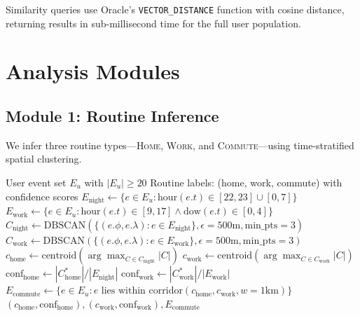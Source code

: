 \documentclass[11pt,a4paper]{article}
\begin{document}
Similarity queries use Oracle's \texttt{VECTOR\_DISTANCE} function with cosine distance, returning results in sub-millisecond time for the full user population.

\section{Analysis Modules}
\label{sec:analysis}

\subsection{Module 1: Routine Inference}
\label{sec:routine_inference}

We infer three routine types---\textsc{Home}, \textsc{Work}, and \textsc{Commute}---using time-stratified spatial clustering.

\begin{algorithm}[H]
\caption{Routine Inference via Time-Stratified DBSCAN}
\label{alg:routine}
\begin{algorithmic}[1]
\REQUIRE User event set $E_u$ with $|E_u| \geq 20$
\ENSURE Routine labels: (home, work, commute) with confidence scores
\STATE $E_{\text{night}} \leftarrow \{e \in E_u : \text{hour}(e.t) \in [22, 23] \cup [0, 7]\}$
\STATE $E_{\text{work}} \leftarrow \{e \in E_u : \text{hour}(e.t) \in [9, 17] \wedge \text{dow}(e.t) \in [0,4]\}$
\STATE $C_{\text{night}} \leftarrow \text{DBSCAN}(\{(e.\phi, e.\lambda) : e \in E_{\text{night}}\}, \epsilon=500\text{m}, \text{min\_pts}=3)$
\STATE $C_{\text{work}} \leftarrow \text{DBSCAN}(\{(e.\phi, e.\lambda) : e \in E_{\text{work}}\}, \epsilon=500\text{m}, \text{min\_pts}=3)$
\STATE $c_{\text{home}} \leftarrow \text{centroid}(\arg\max_{C \in C_{\text{night}}} |C|)$
\STATE $c_{\text{work}} \leftarrow \text{centroid}(\arg\max_{C \in C_{\text{work}}} |C|)$
\STATE $\text{conf}_{\text{home}} \leftarrow |C_{\text{home}}^*| / |E_{\text{night}}|$
\STATE $\text{conf}_{\text{work}} \leftarrow |C_{\text{work}}^*| / |E_{\text{work}}|$
    \STATE $E_{\text{commute}} \leftarrow \{e \in E_u : e \text{ lies within corridor}(c_{\text{home}}, c_{\text{work}}, w=1\text{km})\}$
\ENDIF
\RETURN $(c_{\text{home}}, \text{conf}_{\text{home}}), (c_{\text{work}}, \text{conf}_{\text{work}}), E_{\text{commute}}$
\end{algorithmic}
\end{algorithm}
\end{document}
